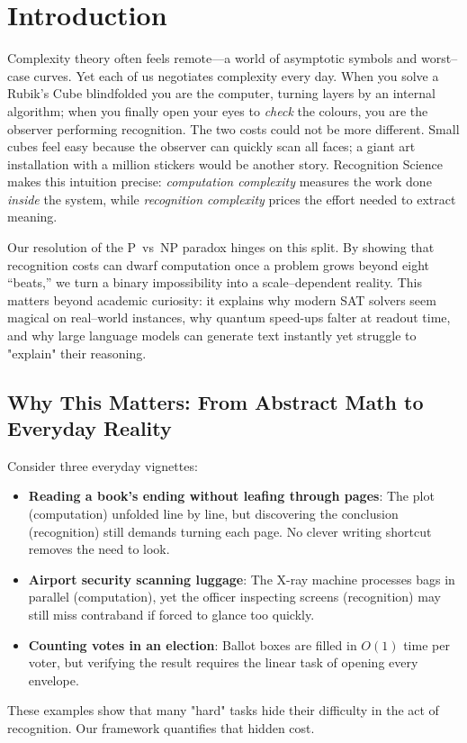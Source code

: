 \documentclass[11pt]{article}
\theoremstyle{plain}
\theoremstyle{definition}
\theoremstyle{remark}
\begin{document}
\section{Introduction}

Complexity theory often feels remote---a world of asymptotic symbols and worst--case curves.  Yet each of us negotiates complexity every day.  When you solve a Rubik's Cube blindfolded you are the computer, turning layers by an internal algorithm; when you finally open your eyes to \emph{check} the colours, you are the observer performing recognition.  The two costs could not be more different.  Small cubes feel easy because the observer can quickly scan all faces; a giant art installation with a million stickers would be another story.  Recognition Science makes this intuition precise: \emph{computation complexity} measures the work done \emph{inside} the system, while \emph{recognition complexity} prices the effort needed to extract meaning.

Our resolution of the P~vs~NP paradox hinges on this split.  By showing that recognition costs can dwarf computation once a problem grows beyond eight ``beats,'' we turn a binary impossibility into a scale--dependent reality.  This matters beyond academic curiosity: it explains why modern SAT solvers seem magical on real--world instances, why quantum speed-ups falter at readout time, and why large language models can generate text instantly yet struggle to "explain" their reasoning.

\subsection{Why This Matters: From Abstract Math to Everyday Reality}

Consider three everyday vignettes:
\begin{itemize}
  \item \textbf{Reading a book's ending without leafing through pages}: The plot (computation) unfolded line by line, but discovering the conclusion (recognition) still demands turning each page.  No clever writing shortcut removes the need to look.
  \item \textbf{Airport security scanning luggage}: The X-ray machine processes bags in parallel (computation), yet the officer inspecting screens (recognition) may still miss contraband if forced to glance too quickly.
  \item \textbf{Counting votes in an election}: Ballot boxes are filled in $O(1)$ time per voter, but verifying the result requires the linear task of opening every envelope.
\end{itemize}
These examples show that many "hard" tasks hide their difficulty in the act of recognition.  Our framework quantifies that hidden cost.
\end{document}
